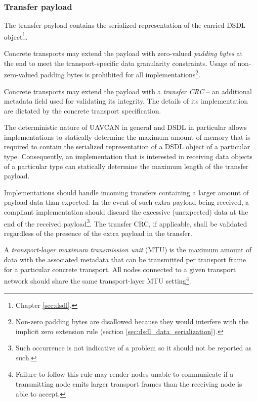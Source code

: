 \subsubsection{Transfer payload}\label{sec:transport_transfer_payload}

The transfer payload contains the serialized representation of the carried
DSDL object\footnote{Chapter \ref{sec:dsdl}.}.

Concrete transports may extend the payload with zero-valued \emph{padding bytes} at the end
to meet the transport-specific data granularity constraints.
Usage of non-zero-valued padding bytes is prohibited for all implementations\footnote{%
    Non-zero padding bytes are disallowed because they would interfere with the implicit zero extension rule
    (section \ref{sec:dsdl_data_serialization}).
}.

Concrete transports may extend the payload with a \emph{transfer CRC}
-- an additional metadata field used for validating its integrity.
The details of its implementation are dictated by the concrete transport specification.

The deterministic nature of UAVCAN in general and DSDL in particular allows implementations to statically determine
the maximum amount of memory that is required to contain the serialized representation
of a DSDL object of a particular type.
Consequently, an implementation that is interested in receiving data objects of a particular type
can statically determine the maximum length of the transfer payload.

Implementations should handle incoming transfers containing a larger amount of payload data than expected.
In the event of such extra payload being received, a compliant implementation should
discard the excessive (unexpected) data at the end of the received payload\footnote{%
    Such occurrence is not indicative of a problem so it should not be reported as such.
}.
The transfer CRC, if applicable, shall be validated regardless of the presence of the extra payload in the transfer.

A \emph{transport-layer maximum transmission unit} (MTU) is the maximum amount of data with the associated metadata
that can be transmitted per transport frame for a particular concrete transport.
All nodes connected to a given transport network should share the same transport-layer MTU setting\footnote{%
    Failure to follow this rule may render nodes unable to communicate if a transmitting node emits larger transport
    frames than the receiving node is able to accept.
}.

